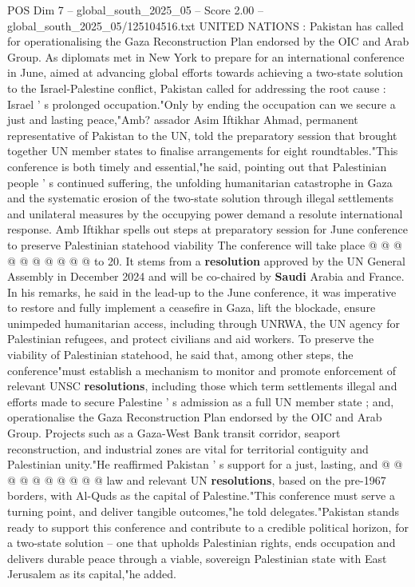 \begin{textsample}{POS Dim 7 – global\_south\_2025\_05 – Score 2.00 – global\_south\_2025\_05/125104516.txt}  \label{ex:f7_pos_232}
UNITED NATIONS : Pakistan has called for operationalising the Gaza Reconstruction Plan endorsed by the OIC and Arab Group.
As diplomats met in New York to prepare for an international conference in June, aimed at advancing global efforts towards achieving a two-state solution to the Israel-Palestine conflict, Pakistan called for addressing the root cause : Israel ' s prolonged occupation."Only by ending the occupation can we secure a just and lasting peace,"Amb? assador Asim Iftikhar Ahmad, permanent representative of Pakistan to the UN, told the preparatory session that brought together UN member states to finalise arrangements for eight roundtables."This conference is both timely and essential,"he said, pointing out that Palestinian people ' s continued suffering, the unfolding humanitarian catastrophe in Gaza and the systematic erosion of the two-state solution through illegal settlements and unilateral measures by the occupying power demand a resolute international response.
Amb Iftikhar spells out steps at preparatory session for June conference to preserve Palestinian statehood viability The conference will take place @ @ @ @ @ @ @ @ @ @ to 20.
It stems from a \textbf{resolution} approved by the UN General Assembly in December 2024 and will be co-chaired by \textbf{Saudi} Arabia and France.
In his remarks, he said in the lead-up to the June conference, it was imperative to restore and fully implement a ceasefire in Gaza, lift the blockade, ensure unimpeded humanitarian access, including through UNRWA, the UN agency for Palestinian refugees, and protect civilians and aid workers.
To preserve the viability of Palestinian statehood, he said that, among other steps, the conference"must establish a mechanism to monitor and promote enforcement of relevant UNSC \textbf{resolutions}, including those which term settlements illegal and efforts made to secure Palestine ' s admission as a full UN member state ; and, operationalise the Gaza Reconstruction Plan endorsed by the OIC and Arab Group.
Projects such as a Gaza-West Bank transit corridor, seaport reconstruction, and industrial zones are vital for territorial contiguity and Palestinian unity."He reaffirmed Pakistan ' s support for a just, lasting, and @ @ @ @ @ @ @ @ @ @ law and relevant UN \textbf{resolutions}, based on the pre-1967 borders, with Al-Quds as the capital of Palestine."This conference must serve a turning point, and deliver tangible outcomes,"he told delegates."Pakistan stands ready to support this conference and contribute to a credible political horizon, for a two-state solution -- one that upholds Palestinian rights, ends occupation and delivers durable peace through a viable, sovereign Palestinian state with East Jerusalem as its capital,"he added.

\end{textsample}
